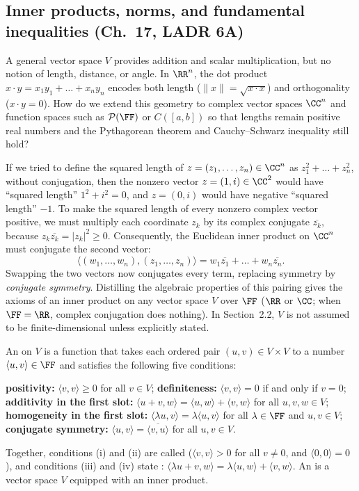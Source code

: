 \documentclass[10pt]{scrartcl}
\newcommand{\ip}[2]{\langle #1,#2\rangle}
\begin{document}
\subsection{Inner products, norms, and fundamental inequalities (Ch.~17, LADR 6A)}

\begin{qbox}
  A general vector space $V$ provides addition and scalar multiplication, but no notion of length, distance, or angle. In $\RR^n$, the dot product $x\cdot y = x_1y_1+\dots+x_ny_n$ encodes both length ($\|x\|=\sqrt{x\cdot x}$) and orthogonality ($x\cdot y=0$). How do we extend this geometry to complex vector spaces $\CC^n$ and function spaces such as $\PP(\FF)$ or $C([a,b])$ so that lengths remain positive real numbers and the Pythagorean theorem and Cauchy--Schwarz inequality still hold?
\end{qbox}

If we tried to define the squared length of $z=(z_1,\dots,z_n)\in\CC^n$ as $z_1^2+\dots+z_n^2$, without conjugation, then the nonzero vector $z=(1,i)\in\CC^2$ would have ``squared length'' $1^2+i^2=0$, and $z=(0,i)$ would have negative ``squared length'' $-1$. To make the squared length of every nonzero complex vector positive, we must multiply each coordinate $z_k$ by its complex conjugate $\overline{z_k}$, because $z_k\overline{z_k}=|z_k|^2\ge 0$. Consequently, the Euclidean inner product on $\CC^n$ must conjugate the second vector:
\[
  \ip{(w_1,\dots,w_n)}{(z_1,\dots,z_n)} = w_1\overline{z_1} + \dots + w_n\overline{z_n}.
\]
Swapping the two vectors now conjugates every term, replacing symmetry by \emph{conjugate symmetry}. Distilling the algebraic properties of this pairing gives the axioms of an inner product on any vector space $V$ over $\FF$ ($\RR$ or $\CC$; when $\FF=\RR$, complex conjugation does nothing). In Section~2.2, $V$ is not assumed to be finite-dimensional unless explicitly stated.

\begin{definition*}
  An  on $V$ is a function that takes each ordered pair $(u,v)\in V\times V$ to a number $\ip uv\in\FF$ and satisfies the following five conditions:
  \begin{enumerate}[(i)]
    \ii \textbf{positivity:} $\ip vv\ge 0$ for all $v\in V$;
    \ii \textbf{definiteness:} $\ip vv=0$ if and only if $v=0$;
    \ii \textbf{additivity in the first slot:} $\ip{u+v}{w}=\ip uw+\ip vw$ for all $u,v,w\in V$;
    \ii \textbf{homogeneity in the first slot:} $\ip{\lambda u}{v}=\lambda\ip uv$ for all $\lambda\in\FF$ and $u,v\in V$;
    \ii \textbf{conjugate symmetry:} $\ip uv=\overline{\ip vu}$ for all $u,v\in V$.
  \end{enumerate}
  Together, conditions (i) and (ii) are called  ($\ip vv>0$ for all $v\ne 0$, and $\ip 00=0$), and conditions (iii) and (iv) state : $\ip{\lambda u+v}{w}=\lambda\ip uw+\ip vw$. An  is a vector space $V$ equipped with an inner product.
\end{definition*}
\end{document}
